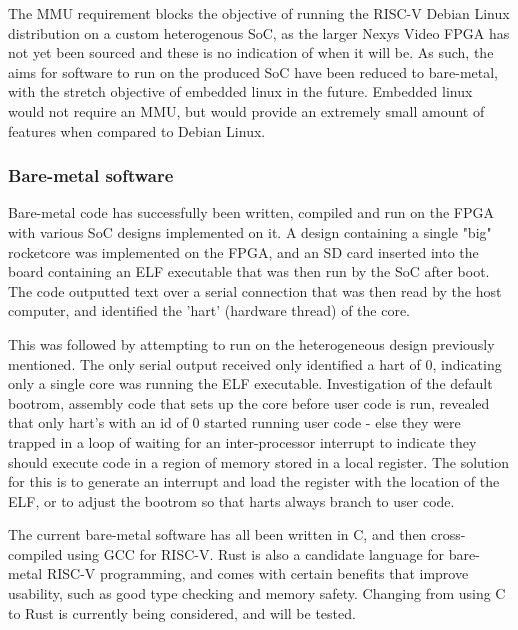 The MMU requirement blocks the objective of running the RISC-V Debian Linux distribution on a custom heterogenous SoC, as the larger Nexys Video FPGA has not yet been sourced and these is no indication of when it will be. As such, the aims for software to run on the produced SoC have been reduced to bare-metal, with the stretch objective of embedded linux in the future. Embedded linux would not require an MMU, but would provide an extremely small amount of features when compared to Debian Linux. 

\subsubsection{Bare-metal software}
Bare-metal code has successfully been written, compiled and run on the FPGA with various SoC designs implemented on it. A design containing a single "big" rocketcore was implemented on the FPGA, and an SD card inserted into the board containing an ELF executable that was then run by the SoC after boot. The code outputted text over a serial connection that was then read by the host computer, and identified the 'hart' (hardware thread) of the core.

This was followed by attempting to run on the heterogeneous design previously mentioned. The only serial output received only identified a hart of 0, indicating only a single core was running the ELF executable. Investigation of the default bootrom, assembly code that sets up the core before user code is run, revealed that only hart's with an id of 0 started running user code - else they were trapped in a loop of waiting for an inter-processor interrupt to indicate they should execute code in a region of memory stored in a local register. The solution for this is to generate an interrupt and load the register with the location of the ELF, or to adjust the bootrom so that harts always branch to user code.

The current bare-metal software has all been written in C, and then cross-compiled using GCC for RISC-V. Rust is also a candidate language for bare-metal RISC-V programming\cite{}, and comes with certain benefits that improve usability, such as good type checking and memory safety. Changing from using C to Rust is currently being considered, and will be tested.